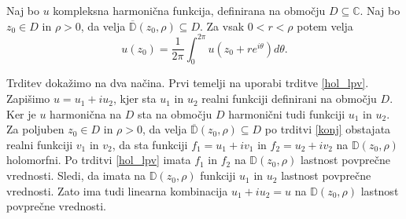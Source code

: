\documentclass[mat1, tisk]{fmfdelo}
\begin{document}
    \begin{trditev}
        \label{harmonicnapovp}
        Naj bo $u$ kompleksna harmonična funkcija, definirana na območju $D \subseteq \mathbb{C}$. Naj bo $z_0 \in D$ in $\rho > 0$, da velja $\overline{\mathbb{D}}(z_0, \rho) \subseteq D$. Za vsak $0 < r < \rho$ potem velja
            $$
                u(z_0) = \frac{1}{2 \pi} \int_{0}^{2 \pi}{u(z_0 + r e^{i \theta}) d\theta}.
            $$
    \end{trditev}
    \begin{dokaz}
        Trditev dokažimo na dva načina. Prvi temelji na uporabi trditve \ref{hol_lpv}. Zapišimo $u = u_1 + i u_2$, kjer sta $u_1$ in $u_2$ realni funkciji definirani na območju $D$.
        Ker je $u$ harmonična na $D$ sta na območju $D$ harmonični tudi funkciji $u_1$ in $u_2$. Za poljuben $z_0 \in D$ in $\rho > 0$, da velja $\overline{\mathbb{D}}(z_0, \rho) \subseteq D$ po trditvi \ref{konj} obstajata realni funkciji $v_1$ in $v_2$, da sta 
        funkciji $f_1 = u_1 + i v_1$ in $f_2 = u_2 + i v_2$ na $\mathbb{D}(z_0, \rho)$ holomorfni. Po trditvi \ref{hol_lpv} imata $f_1$ in $f_2$ na $\mathbb{D}(z_0, \rho)$ lastnost povprečne vrednosti.
        Sledi, da imata na $\mathbb{D}(z_0, \rho)$ funkciji $u_1$ in $u_2$ lastnost povprečne vrednosti. Zato ima tudi linearna kombinacija $u_1 + i u_2 = u$ na $\mathbb{D}(z_0, \rho)$ lastnost povprečne vrednosti.


\end{dokaz}
\end{document}
